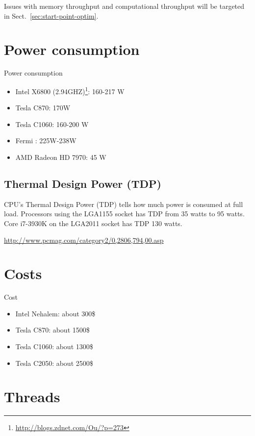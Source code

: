   \begin{framed}
    Issues with memory throughput and computational throughput will be
    targeted in Sect.~\ref{sec:start-point-optim}.
  \end{framed}

\section{Power consumption}
\label{sec:power-consumption}

Power consumption
  \begin{itemize}
  \item Intel X6800
    (2.94GHZ)\footnote{\url{http://blogs.zdnet.com/Ou/?p=273}}:
    160-217 W
  \item Tesla C870: 170W
  \item Tesla C1060: 160-200 W
  \item Fermi : 225W-238W
  \item AMD Radeon HD 7970: 45 W
  \end{itemize}

\subsection{Thermal Design Power (TDP)}
\label{sec:TDP-thermal-design-power}

CPU's Thermal Design Power (TDP) tells how much power is consumed at full load.
Processors using the LGA1155 socket has TDP from 35 watts to 95 watts. 
Core i7-3930K on the LGA2011 socket has TDP 130 watts. 

\url{http://www.pcmag.com/category2/0,2806,794,00.asp}

\section{Costs}
\label{sec:costs}

Cost
\begin{itemize}
\item Intel Nehalem: about 300\$
\item Tesla C870: about 1500\$
\item Tesla C1060: about 1300\$
\item Tesla C2050: about 2500\$
\end{itemize}


\section{Threads}
\label{sec:threads-1}

